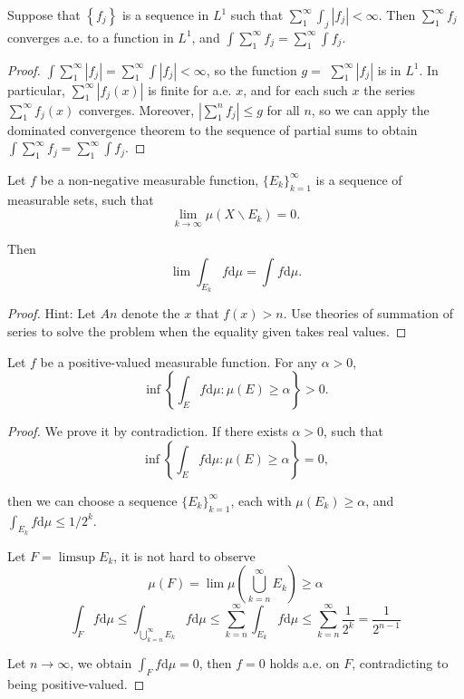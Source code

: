 \begin{problem}
Suppose that $\left\{f_j\right\}$ is a sequence in $L^1$ such that $\sum_1^{\infty} \int_j\left|f_j\right|<\infty$. Then $\sum_1^{\infty} f_j$ converges a.e. to a function in $L^1$, and $\int \sum_1^{\infty} f_j=\sum_1^{\infty} \int f_j$.
\end{problem}

\begin{proof}
	$\int \sum_1^{\infty}\left|f_j\right|=\sum_1^{\infty} \int\left|f_j\right|<\infty$, so the function $g=$ $\sum_1^{\infty}\left|f_j\right|$ is in $L^1$.
	In particular, $\sum_1^{\infty}\left|f_j(x)\right|$ is finite for a.e. $x$, and for each such $x$ the series $\sum_1^{\infty} f_j(x)$ converges.
	Moreover, $\left|\sum_1^n f_j\right| \leq g$ for all $n$, so we can apply the dominated convergence theorem to the sequence of partial sums to obtain $\int \sum_1^{\infty} f_j=\sum_1^{\infty} \int f_j$.
\end{proof}

\begin{problem}
Let $ f $ be a non-negative measurable function, $ \{E_{k}\}_{k=1}^{\infty} $ is a sequence of measurable sets, such that
\[
	\lim_{k\to \infty} \mu(X\backslash E_{k})=0.
\]

Then
$$
	\lim \int_{E_k}^{}{f\mathrm{d}\mu}=\int_{}^{}{f\mathrm{d}\mu}.
$$
\end{problem}

\begin{proof}
%

    Hint: Let $An$ denote the $x$ that $f(x)>n$. Use theories of summation of series to solve the problem when the equality given takes real values.
\end{proof}

\begin{problem}
Let $ f $ be a positive-valued measurable function. For any $ \alpha>0 $,
\[
	\inf\left\{ \int_E^{}{f\mathrm{d}\mu}:\mu ( E ) \ge \alpha \right\} >0.
\]
\end{problem}

\begin{proof}
	We prove it by contradiction. If there exists $ \alpha>0 $, such that
	\[
		\inf\left\{ \int_E^{}{f\mathrm{d}\mu}:\mu ( E ) \ge \alpha \right\} =0,
	\]

	then we can choose a sequence $ \{E_{k}\}_{k=1}^{\infty} $, each with $ \mu(E_{k})\ge \alpha $, and $ \int_{E_{k}}^{}{f\mathrm{d}\mu}\le 1/2^{k} $.

	Let $ F=\limsup E_{k} $, it is not hard to observe
	$$
		\mu ( F ) =\lim \mu \left( \bigcup_{k=n}^{\infty}{E_k} \right) \ge \alpha
	$$
	$$
		\int_F^{}{f\mathrm{d}\mu}\le \int_{\bigcup_{k=n}^{\infty}{E_k}}^{}{f\mathrm{d}\mu}\le \sum_{k=n}^{\infty}{\int_{E_k}^{}{f\mathrm{d}\mu}}\le \sum_{k=n}^{\infty}{\frac{1}{2^k}}=\frac{1}{2^{n-1}}
	$$

	Let $ n\to \infty $, we obtain $
		\int_F^{}{f\mathrm{d}\mu}=0
	$, then $ f=0 $ holds a.e. on $ F $, contradicting to being positive-valued.
\end{proof}

